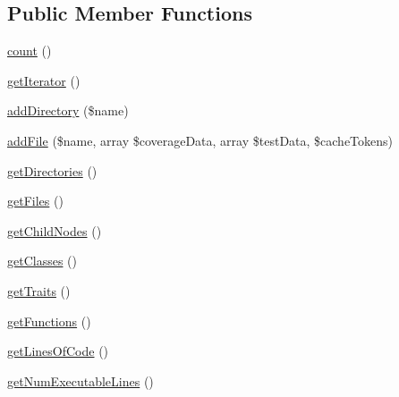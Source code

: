 \subsection*{Public Member Functions}
\begin{DoxyCompactItemize}
\item 
\mbox{\hyperlink{class_sebastian_bergmann_1_1_code_coverage_1_1_node_1_1_directory_ac751e87b3d4c4bf2feb03bee8b092755}{count}} ()
\item 
\mbox{\hyperlink{class_sebastian_bergmann_1_1_code_coverage_1_1_node_1_1_directory_a7a9f937c2958e6f4dd7b030f86fb70b7}{get\+Iterator}} ()
\item 
\mbox{\hyperlink{class_sebastian_bergmann_1_1_code_coverage_1_1_node_1_1_directory_a1a418de89a53c74e230f440c3b8dd3a1}{add\+Directory}} (\$name)
\item 
\mbox{\hyperlink{class_sebastian_bergmann_1_1_code_coverage_1_1_node_1_1_directory_a845680b264acd81f4c0c454a5680424c}{add\+File}} (\$name, array \$coverage\+Data, array \$test\+Data, \$cache\+Tokens)
\item 
\mbox{\hyperlink{class_sebastian_bergmann_1_1_code_coverage_1_1_node_1_1_directory_a67901c2e59ffc4bb1c0010ac9cce2560}{get\+Directories}} ()
\item 
\mbox{\hyperlink{class_sebastian_bergmann_1_1_code_coverage_1_1_node_1_1_directory_a7010e197d8dce475dfdd443c11dd7ee9}{get\+Files}} ()
\item 
\mbox{\hyperlink{class_sebastian_bergmann_1_1_code_coverage_1_1_node_1_1_directory_afbccaa1cbadf90b7a7589f49f97c16d6}{get\+Child\+Nodes}} ()
\item 
\mbox{\hyperlink{class_sebastian_bergmann_1_1_code_coverage_1_1_node_1_1_directory_aaab663f8e00e05d4f6853d580e231e14}{get\+Classes}} ()
\item 
\mbox{\hyperlink{class_sebastian_bergmann_1_1_code_coverage_1_1_node_1_1_directory_a8985442e8133cd567bf7ce548f96561f}{get\+Traits}} ()
\item 
\mbox{\hyperlink{class_sebastian_bergmann_1_1_code_coverage_1_1_node_1_1_directory_a131c2522f07821f77cd1d038c216031b}{get\+Functions}} ()
\item 
\mbox{\hyperlink{class_sebastian_bergmann_1_1_code_coverage_1_1_node_1_1_directory_a078d4af993fd559bc026b82d6d324ca3}{get\+Lines\+Of\+Code}} ()
\item 
\mbox{\hyperlink{class_sebastian_bergmann_1_1_code_coverage_1_1_node_1_1_directory_a70a600ff3ef3002740ad1ce48814bee1}{get\+Num\+Executable\+Lines}} ()
\item 

\end{DoxyCompactItemize}
